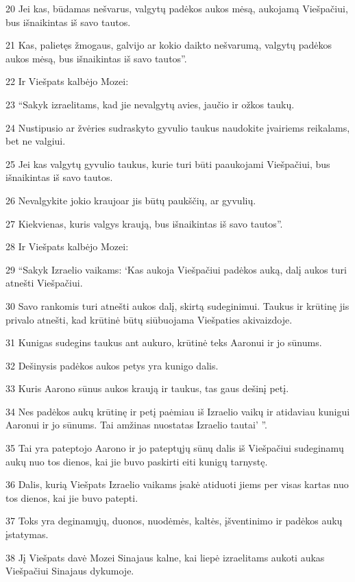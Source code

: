 \par 20 Jei kas, būdamas nešvarus, valgytų padėkos aukos mėsą, aukojamą Viešpačiui, bus išnaikintas iš savo tautos. 
\par 21 Kas, palietęs žmogaus, galvijo ar kokio daikto nešvarumą, valgytų padėkos aukos mėsą, bus išnaikintas iš savo tautos”. 
\par 22 Ir Viešpats kalbėjo Mozei: 
\par 23 “Sakyk izraelitams, kad jie nevalgytų avies, jaučio ir ožkos taukų. 
\par 24 Nustipusio ar žvėries sudraskyto gyvulio taukus naudokite įvairiems reikalams, bet ne valgiui. 
\par 25 Jei kas valgytų gyvulio taukus, kurie turi būti paaukojami Viešpačiui, bus išnaikintas iš savo tautos. 
\par 26 Nevalgykite jokio kraujo­ar jis būtų paukščių, ar gyvulių. 
\par 27 Kiekvienas, kuris valgys kraują, bus išnaikintas iš savo tautos”. 
\par 28 Ir Viešpats kalbėjo Mozei: 
\par 29 “Sakyk Izraelio vaikams: ‘Kas aukoja Viešpačiui padėkos auką, dalį aukos turi atnešti Viešpačiui. 
\par 30 Savo rankomis turi atnešti aukos dalį, skirtą sudeginimui. Taukus ir krūtinę jis privalo atnešti, kad krūtinė būtų siūbuojama Viešpaties akivaizdoje. 
\par 31 Kunigas sudegins taukus ant aukuro, krūtinė teks Aaronui ir jo sūnums. 
\par 32 Dešinysis padėkos aukos petys yra kunigo dalis. 
\par 33 Kuris Aarono sūnus aukos kraują ir taukus, tas gaus dešinį petį. 
\par 34 Nes padėkos aukų krūtinę ir petį paėmiau iš Izraelio vaikų ir atidaviau kunigui Aaronui ir jo sūnums. Tai amžinas nuostatas Izraelio tautai’ ”. 
\par 35 Tai yra pateptojo Aarono ir jo pateptųjų sūnų dalis iš Viešpačiui sudeginamų aukų nuo tos dienos, kai jie buvo paskirti eiti kunigų tarnystę. 
\par 36 Dalis, kurią Viešpats Izraelio vaikams įsakė atiduoti jiems per visas kartas nuo tos dienos, kai jie buvo patepti. 
\par 37 Toks yra deginamųjų, duonos, nuodėmės, kaltės, įšventinimo ir padėkos aukų įstatymas. 
\par 38 Jį Viešpats davė Mozei Sinajaus kalne, kai liepė izraelitams aukoti aukas Viešpačiui Sinajaus dykumoje.



